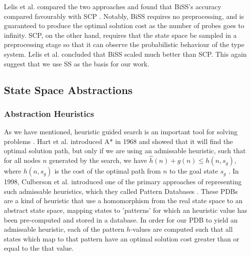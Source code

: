\documentclass{article}
\begin{document}
Lelis et al. compared the two approaches  and found that BiSS's
accuracy compared favourably with SCP \cite{lelis2012predicting}.
Notably, BiSS requires no preprocessing, and is guaranteed to produce the optimal solution cost
as the number of probes goes to infinity.
SCP, on the other hand, requires that the state space be sampled in a preprocessing
stage so that it can observe the probabilistic behaviour of the type system. Lelis et al. concluded
that BiSS scaled much better than SCP. This again suggest that we use SS as the basis for our work.

\subsection{State Space Abstractions}

\subsubsection*{Abstraction Heuristics}

As we have mentioned, heuristic guided search is an important tool for solving problems .
Hart et al. introduced A* in 1968 \cite{hart1968formal}  and showed that it will find the optimal solution path,
but only if we are using an admissable heuristic, such that for all nodes \(n\) generated by the search,
we have \(\hat{h}(n) + g(n) \leq h(n, s_g)\), where \(h(n, s_g)\) is
the cost of the optimal path from \(n\) to the goal state \(s_g\) \cite{pearl1984heuristics}.
In 1998, Culberson et al. introduced one of the primary approaches of representing such admissable heuristics,
which they called Pattern Databases \cite{culberson1998pattern}.
These PDBs are a kind of heuristic that use a homomorphism from the real state
space to an abstract state space, mapping states to 'patterns'
for which an heuristic value has been pre-computed and stored in a database.
In order for our PDB to yield an admissable heuristic,
each of the pattern \(h\)-values are computed such that all states which map to that pattern have an optimal solution cost greater than
or equal to the that value. \\
\end{document}
